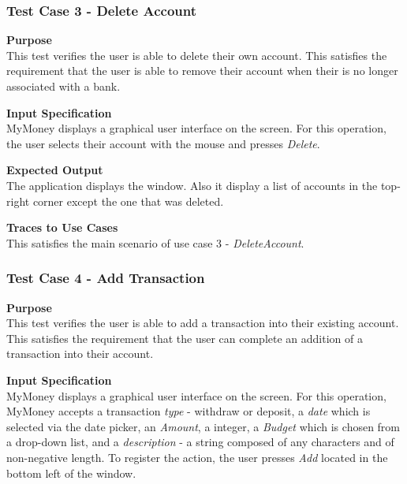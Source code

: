 \documentclass[12pt]{article}
\begin{document}
\clearpage %


\subsubsection{Test Case 3 - Delete Account} \label{TC-3}
\noindent
{\bf Purpose}\\
 This test verifies the user is able to delete their own account.
 This satisfies the requirement that the user is able to remove their account when their is no longer associated
 with a bank. 

 \noindent
 {\bf Input Specification}\\
 MyMoney displays a graphical user interface on the screen.
 For this operation, the user selects their account with the mouse and presses \textit{Delete}.
                            
 \noindent
 {\bf Expected Output}\\
 The application displays the window.
 Also it display a list of accounts in the top-right corner except the one that was deleted.

\noindent
{\bf Traces to Use Cases}\\
This satisfies the main scenario of use case 3 - \textit{DeleteAccount}.


\subsubsection{Test Case 4 - Add Transaction} \label{TC-4}

\noindent
{\bf Purpose}\\
This test verifies the user is able to add a transaction into their existing account.
This satisfies the requirement that the user can complete an addition of a transaction into their account.
                                        
\noindent
{\bf Input Specification}\\
MyMoney displays a graphical user interface on the screen.
For this operation, MyMoney accepts a transaction \textit{type} - withdraw or deposit, a \textit{date}
which is selected via the date picker, an \textit{Amount}, a integer, a \textit{Budget} which is chosen
from a drop-down list, and a \textit{description} - a string composed of any characters and
of non-negative length. To register the action, the user presses \textit{Add} located in the bottom left
of the window.                                          
\end{document}
